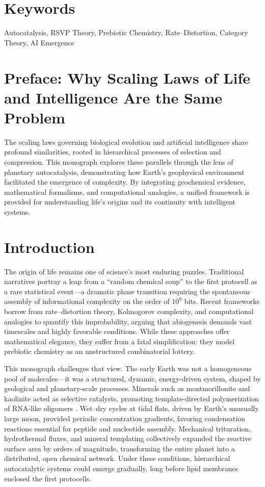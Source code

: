 \documentclass[openany]{book}
\begin{document}
\section*{Keywords}
Autocatalysis, RSVP Theory, Prebiotic Chemistry, Rate–Distortion, Category Theory, AI Emergence

\section*{Preface: Why Scaling Laws of Life and Intelligence Are the Same Problem}
The scaling laws governing biological evolution and artificial intelligence share profound similarities, rooted in hierarchical processes of selection and compression. This monograph explores these parallels through the lens of planetary autocatalysis, demonstrating how Earth's geophysical environment facilitated the emergence of complexity. By integrating geochemical evidence, mathematical formalisms, and computational analogies, a unified framework is provided for understanding life's origins and its continuity with intelligent systems.

\section{Introduction}
The origin of life remains one of science’s most enduring puzzles. Traditional narratives portray a leap from a “random chemical soup” to the first protocell as a rare statistical event—a dramatic phase transition requiring the spontaneous assembly of informational complexity on the order of $10^9$ bits. Recent frameworks borrow from rate–distortion theory, Kolmogorov complexity, and computational analogies to quantify this improbability, arguing that abiogenesis demands vast timescales and highly favorable conditions. While these approaches offer mathematical elegance, they suffer from a fatal simplification: they model prebiotic chemistry as an unstructured combinatorial lottery.

This monograph challenges that view. The early Earth was not a homogeneous pool of molecules—it was a structured, dynamic, energy-driven system, shaped by geological and planetary-scale processes. Minerals such as montmorillonite and kaolinite acted as selective catalysts, promoting template-directed polymerization of RNA-like oligomers \citep{hazen2005}. Wet–dry cycles at tidal flats, driven by Earth’s unusually large moon, provided periodic concentration gradients, favoring condensation reactions essential for peptide and nucleotide assembly. Mechanical trituration, hydrothermal fluxes, and mineral templating collectively expanded the reactive surface area by orders of magnitude, transforming the entire planet into a distributed, open chemical network. Under these conditions, hierarchical autocatalytic systems could emerge gradually, long before lipid membranes enclosed the first protocells.
\end{document}
